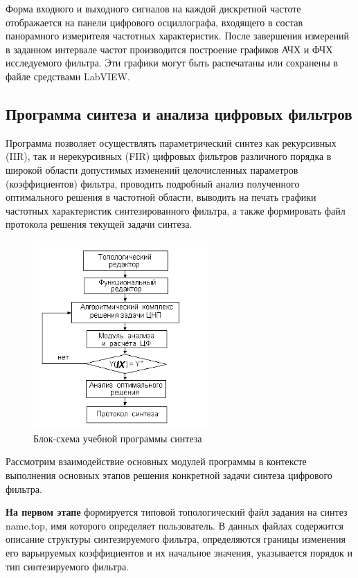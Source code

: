\documentclass[a4paper,14pt]{extarticle}
\begin{document}
Форма входного и выходного сигналов на каждой дискретной частоте отображается на панели цифрового осциллографа, входящего в состав панорамного измерителя частотных характеристик. После завершения измерений в заданном интервале частот производится построение графиков АЧХ и ФЧХ исследуемого фильтра. Эти графики могут быть распечатаны или сохранены в файле средствами LabVIEW.


\subsection{Программа синтеза и анализа цифровых фильтров}
Программа позволяет осуществлять параметрический синтез как рекурсивных (IIR), так и нерекурсивных (FIR) цифровых фильтров различного порядка в широкой области допустимых изменений целочисленных параметров (коэффициентов) фильтра, проводить подробный анализ полученного оптимального решения в частотной области, выводить на печать графики частотных характеристик синтезированного фильтра, а также формировать файл протокола решения текущей задачи синтеза. 
\begin{figure}[h!]
  \centering
  \includegraphics[width=0.6\textwidth]{img/img4}
  \caption{Блок-схема учебной программы синтеза}
  \label{fig:figure1}
\end{figure}
Рассмотрим взаимодействие основных модулей программы в контексте выполнения основных этапов решения конкретной задачи синтеза цифрового фильтра.

\textbf{На первом этапе} формируется типовой топологический файл задания на синтез  name.top, имя которого определяет пользователь. В данных файлах содержится описание структуры синтезируемого фильтра, определяются границы изменения его варьируемых коэффициентов и их начальное значения, указывается порядок и тип синтезируемого фильтра.
\end{document}
